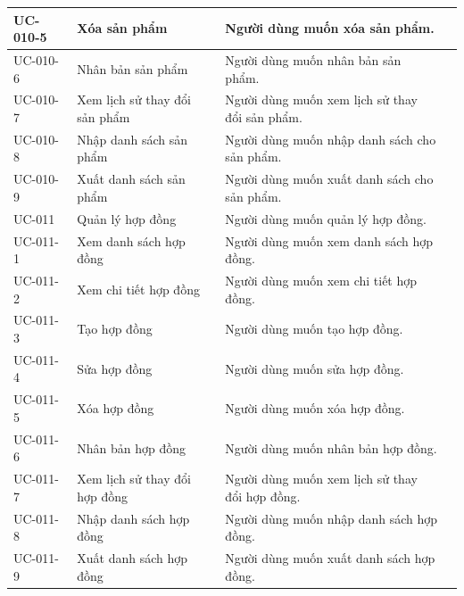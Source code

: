\documentclass[12pt,a4paper]{article}
\begin{document}
\begin{center}
\begin{longtable}{|p{2.5cm}|p{4.5cm}|p{7.5cm}|c|}
            \\ \hline
            UC-010-5
            & Xóa sản phẩm
            & Người dùng muốn xóa sản phẩm.
            \\ \hline
            UC-010-6
            & Nhân bản sản phẩm
            & Người dùng muốn nhân bản sản phẩm.
            \\ \hline
            UC-010-7
            & Xem lịch sử thay đổi sản phẩm
            & Người dùng muốn xem lịch sử thay đổi sản phẩm.
            \\ \hline
            UC-010-8
            & Nhập danh sách sản phẩm
            & Người dùng muốn nhập danh sách cho sản phẩm.
            \\ \hline
            UC-010-9
            & Xuất danh sách sản phẩm
            & Người dùng muốn xuất danh sách cho sản phẩm.
            \\ \hline
            UC-011
            & Quản lý hợp đồng
            & Người dùng muốn quản lý hợp đồng.
            \\ \hline
            UC-011-1
            & Xem danh sách hợp đồng
            & Người dùng muốn xem danh sách hợp đồng.
            \\ \hline
            UC-011-2
            & Xem chi tiết hợp đồng
            & Người dùng muốn xem chi tiết hợp đồng.
            \\ \hline
            UC-011-3
            & Tạo hợp đồng
            & Người dùng muốn tạo hợp đồng.
            \\ \hline
            UC-011-4
            & Sửa hợp đồng
            & Người dùng muốn sửa hợp đồng.
            \\ \hline
            UC-011-5
            & Xóa hợp đồng
            & Người dùng muốn xóa hợp đồng.
            \\ \hline
            UC-011-6
            & Nhân bản hợp đồng
            & Người dùng muốn nhân bản hợp đồng.
            \\ \hline
            UC-011-7
            & Xem lịch sử thay đổi hợp đồng
            & Người dùng muốn xem lịch sử thay đổi hợp đồng.
            \\ \hline
            UC-011-8
            & Nhập danh sách hợp đồng
            & Người dùng muốn nhập danh sách hợp đồng.
            \\ \hline
            UC-011-9
            & Xuất danh sách hợp đồng
            & Người dùng muốn xuất danh sách hợp đồng.
            \\ \hline

\end{longtable}
\end{center}
\end{document}
